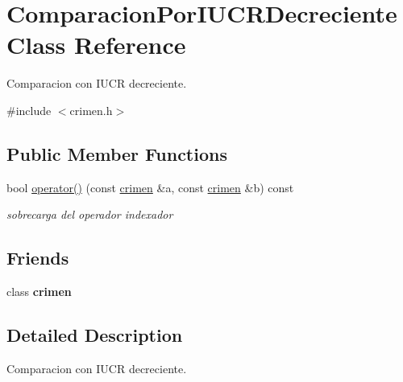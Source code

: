 \hypertarget{classComparacionPorIUCRDecreciente}{\section{Comparacion\-Por\-I\-U\-C\-R\-Decreciente Class Reference}
\label{classComparacionPorIUCRDecreciente}
}


Comparacion con I\-U\-C\-R decreciente.  




{\ttfamily \#include $<$crimen.\-h$>$}

\subsection*{Public Member Functions}
\begin{DoxyCompactItemize}
\item 
bool \hyperlink{classComparacionPorIUCRDecreciente_ace68b0b38cc5492117a7d7d1bef13bea}{operator()} (const \hyperlink{classcrimen}{crimen} \&a, const \hyperlink{classcrimen}{crimen} \&b) const 
\begin{DoxyCompactList}\small\item\em sobrecarga del operador indexador \end{DoxyCompactList}\end{DoxyCompactItemize}
\subsection*{Friends}
\begin{DoxyCompactItemize}
\item 
\hypertarget{classComparacionPorIUCRDecreciente_a95cf0cce33343b561a43ff7566515870}{class {\bfseries crimen}}\label{classComparacionPorIUCRDecreciente_a95cf0cce33343b561a43ff7566515870}

\end{DoxyCompactItemize}


\subsection{Detailed Description}
Comparacion con I\-U\-C\-R decreciente. 

